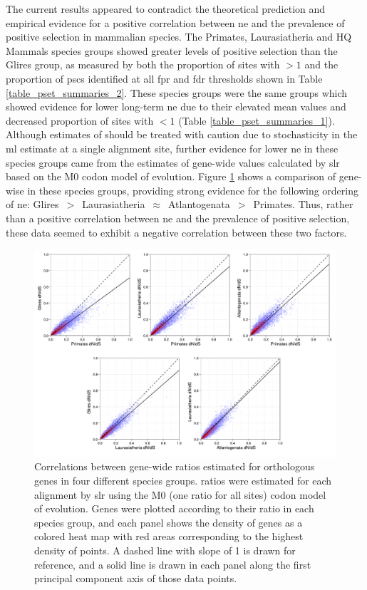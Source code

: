 The current results appeared to contradict the theoretical prediction
and empirical evidence for a positive correlation between \ac{ne} and
the prevalence of positive selection in mammalian species. The
Primates, Laurasiatheria and HQ Mammals species groups showed greater
levels of positive selection than the Glires group, as measured by
both the proportion of sites with \omgml$>1$ and the proportion of
\acp{psc} identified at all \ac{fpr} and \ac{fdr} thresholds shown in
Table \ref{table_pset_summaries_2}. These species groups were the same
groups which showed evidence for lower long-term \ac{ne} due to their
elevated mean \omgml values and decreased proportion of sites with
\omgml$<1$ (Table \ref{table_pset_summaries_1}). Although estimates of
\omgml should be treated with caution due to stochasticity in the
\ac{ml} estimate at a single alignment site, further evidence for
lower \ac{ne} in these species groups came from the estimates of
gene-wide \dnds values calculated by \ac{slr} based on the M0 codon
model of evolution. Figure \ref{fig_mammals_dnds_ratios} shows a
comparison of gene-wise \dnds in these species groups, providing
strong evidence for the following ordering of \ac{ne}:
Glires~$>$~Laurasiatheria~$\approx$~Atlantogenata~$>$~Primates. Thus,
rather than a positive correlation between \ac{ne} and the prevalence
of positive selection, these \sw data seemed to exhibit a negative
correlation between these two factors.

\begin{figure}[t!]
\centering
\includegraphics[scale=0.5]{Figs/mammals_dnds_ratios.pdf}
\caption{Correlations between gene-wide \dnds ratios estimated for
  \ntrees orthologous genes in four different species groups. \dnds
  ratios were estimated for each alignment by \ac{slr} using the M0
  (one ratio for all sites) codon model of evolution. Genes were
  plotted according to their \dnds ratio in each species group, and
  each panel shows the density of genes as a colored heat map with red
  areas corresponding to the highest density of points. A dashed line
  with slope of 1 is drawn for reference, and a solid line is drawn in
  each panel along the first principal component axis of those data
  points.}
\label{fig_mammals_dnds_ratios}
\end{figure}

